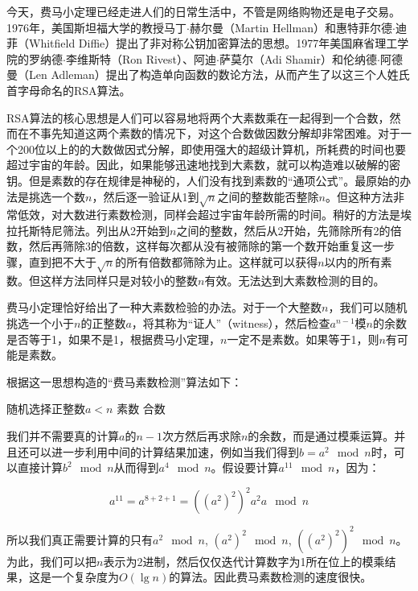 \documentclass{article}
\begin{document}
\vspace{5mm}

今天，费马小定理已经走进人们的日常生活中，不管是网络购物还是电子交易。1976年，美国斯坦福大学的教授马丁$\cdot$赫尔曼（Martin Hellman）和惠特菲尔德$\cdot$迪菲（Whitfield Diffie）提出了非对称公钥加密算法的思想。1977年美国麻省理工学院的罗纳德$\cdot$李维斯特（Ron Rivest）、阿迪$\cdot$萨莫尔（Adi Shamir）和伦纳德$\cdot$阿德曼（Len Adleman）提出了构造单向函数的数论方法，从而产生了以这三个人姓氏首字母命名的RSA算法。

RSA算法的核心思想是人们可以容易地将两个大素数乘在一起得到一个合数，然而在不事先知道这两个素数的情况下，对这个合数做因数分解却非常困难。对于一个200位以上的的大数做因式分解，即使用强大的超级计算机，所耗费的时间也要超过宇宙的年龄。因此，如果能够迅速地找到大素数，就可以构造难以破解的密钥。但是素数的存在规律是神秘的，人们没有找到素数的“通项公式”。最原始的办法是挑选一个数$n$，然后逐一验证从1到$\sqrt{n}$之间的整数能否整除$n$。但这种方法非常低效，对大数进行素数检测，同样会超过宇宙年龄所需的时间。稍好的方法是埃拉托斯特尼筛法。列出从2开始到$n$之间的整数，然后从2开始，先筛除所有2的倍数，然后再筛除3的倍数，这样每次都从没有被筛除的第一个数开始重复这一步骤，直到把不大于$\sqrt{n}$的所有倍数都筛除为止。这样就可以获得$n$以内的所有素数。但这样方法同样只是对较小的整数$n$有效。无法达到大素数检测的目的。

费马小定理恰好给出了一种大素数检验的办法。对于一个大整数$n$，我们可以随机挑选一个小于$n$的正整数$a$，将其称为“证人”（witness），然后检查$a^{n-1}$模$n$的余数是否等于1，如果不是1，根据费马小定理，$n$一定不是素数。如果等于1，则$n$有可能是素数。

根据这一思想构造的“费马素数检测”算法如下：

\begin{algorithmic}
  \State 随机选择正整数$a < n$
    \State \Return 素数
  \Else
    \State \Return 合数
  \EndIf
\EndFunction
\end{algorithmic}

我们并不需要真的计算$a$的$n-1$次方然后再求除$n$的余数，而是通过模乘运算。并且还可以进一步利用中间的计算结果加速，例如当我们得到$b = a^2 \mod n$时，可以直接计算$b^2 \mod n$从而得到$a^4 \mod n$。假设要计算$a^{11} \mod n$，因为：

\[
a^{11} = a^{8 + 2 + 1} = ((a^2)^2)^2a^2a \mod n
\]

所以我们真正需要计算的只有$a^2 \mod n$, $(a^2)^2 \mod n$, $((a^2)^2)^2 \mod n$。为此，我们可以把$n$表示为2进制，然后仅仅迭代计算数字为1所在位上的模乘结果，这是一个复杂度为$O(\lg n)$的算法。因此费马素数检测的速度很快。
\end{document}
